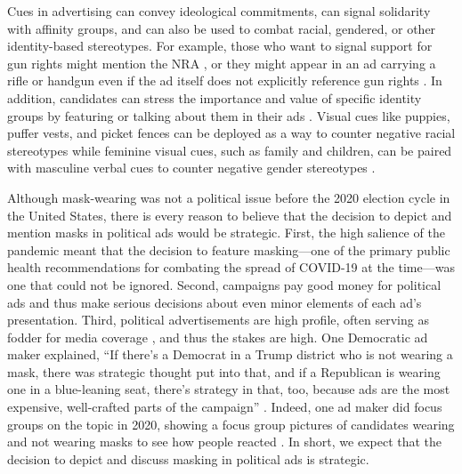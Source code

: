 Cues in advertising can convey ideological commitments, can signal solidarity with affinity groups, and can also be used to combat racial, gendered, or other identity-based stereotypes. For example, those who want to signal support for gun rights might mention the NRA \parencite{barry_guns_2020}, or they might appear in an ad carrying a rifle or handgun even if the ad itself does not explicitly reference gun rights \parencite{FFR_2021}. In addition, candidates can stress the importance and value of specific identity groups by featuring or talking about them in their ads \parencite{connaughton_invitations_2004}. Visual cues like puppies, puffer vests, and picket fences can be deployed as a way to counter negative racial stereotypes \parencite{tesler_raphael_2020,stephens-dougan_race_2020,gillespie_race_2018,hajnal_changing_2006} while feminine visual cues, such as family and children, can be paired with masculine verbal cues to counter negative gender stereotypes \parencite{carpinella2021visual}. 

Although mask-wearing was not a political issue before the 2020 election cycle in the United States, there is every reason to believe that the decision to depict and mention masks in political ads would be strategic. First, the high salience of the pandemic meant that the decision to feature masking---one of the primary public health recommendations for combating the spread of COVID-19 at the time---was one that could not be ignored. Second, campaigns pay good money for political ads and thus make serious decisions about even minor elements of each ad's presentation. Third, political advertisements are high profile, often serving as fodder for media coverage \parencite{fowler_local_2009}, and thus the stakes are high. One Democratic ad maker explained, ``If there’s a Democrat in a Trump district who is not wearing a mask, there was strategic thought put into that, and if a Republican is wearing one in a blue-leaning seat, there’s strategy in that, too, because ads are the most expensive, well-crafted parts of the campaign'' \parencite{schneider_face_2020}.  Indeed, one ad maker did focus groups on the topic in 2020, showing a focus group pictures of candidates wearing and not wearing masks to see how people reacted \parencite{schneider_face_2020}.  In short, we expect that the decision to depict and discuss masking in political ads is strategic.

